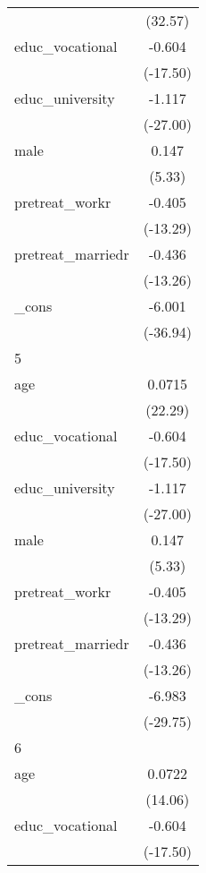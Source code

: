 {\begin{tabular}{l*{1}{c}}
            &     (32.57)         \\
[1em]
educ\_vocational&      -0.604\sym{***}\\
            &    (-17.50)         \\
[1em]
educ\_university&      -1.117\sym{***}\\
            &    (-27.00)         \\
[1em]
male        &       0.147\sym{***}\\
            &      (5.33)         \\
[1em]
pretreat\_workr&      -0.405\sym{***}\\
            &    (-13.29)         \\
[1em]
pretreat\_marriedr&      -0.436\sym{***}\\
            &    (-13.26)         \\
[1em]
\_cons      &      -6.001\sym{***}\\
            &    (-36.94)         \\
\hline
5           &                     \\
age         &      0.0715\sym{***}\\
            &     (22.29)         \\
[1em]
educ\_vocational&      -0.604\sym{***}\\
            &    (-17.50)         \\
[1em]
educ\_university&      -1.117\sym{***}\\
            &    (-27.00)         \\
[1em]
male        &       0.147\sym{***}\\
            &      (5.33)         \\
[1em]
pretreat\_workr&      -0.405\sym{***}\\
            &    (-13.29)         \\
[1em]
pretreat\_marriedr&      -0.436\sym{***}\\
            &    (-13.26)         \\
[1em]
\_cons      &      -6.983\sym{***}\\
            &    (-29.75)         \\
\hline
6           &                     \\
age         &      0.0722\sym{***}\\
            &     (14.06)         \\
[1em]
educ\_vocational&      -0.604\sym{***}\\
            &    (-17.50)         \\

\end{tabular}}

